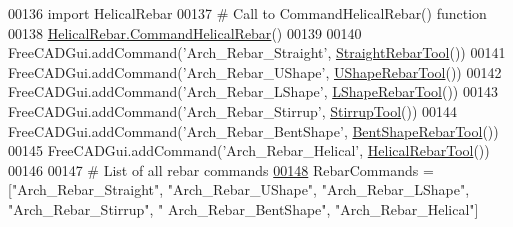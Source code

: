 \begin{DoxyCode}
00136         \textcolor{keyword}{import} HelicalRebar
00137         \textcolor{comment}{# Call to CommandHelicalRebar() function}
00138         \hyperlink{namespaceHelicalRebar_ad8ff0caf1e8a56ac47ce25062db8bc46}{HelicalRebar.CommandHelicalRebar}()
00139 
00140 FreeCADGui.addCommand(\textcolor{stringliteral}{'Arch\_Rebar\_Straight'}, \hyperlink{classRebarTools_1_1StraightRebarTool}{StraightRebarTool}())
00141 FreeCADGui.addCommand(\textcolor{stringliteral}{'Arch\_Rebar\_UShape'}, \hyperlink{classRebarTools_1_1UShapeRebarTool}{UShapeRebarTool}())
00142 FreeCADGui.addCommand(\textcolor{stringliteral}{'Arch\_Rebar\_LShape'}, \hyperlink{classRebarTools_1_1LShapeRebarTool}{LShapeRebarTool}())
00143 FreeCADGui.addCommand(\textcolor{stringliteral}{'Arch\_Rebar\_Stirrup'}, \hyperlink{classRebarTools_1_1StirrupTool}{StirrupTool}())
00144 FreeCADGui.addCommand(\textcolor{stringliteral}{'Arch\_Rebar\_BentShape'}, \hyperlink{classRebarTools_1_1BentShapeRebarTool}{BentShapeRebarTool}())
00145 FreeCADGui.addCommand(\textcolor{stringliteral}{'Arch\_Rebar\_Helical'}, \hyperlink{classRebarTools_1_1HelicalRebarTool}{HelicalRebarTool}())
00146 
00147 \textcolor{comment}{# List of all rebar commands}
\hypertarget{RebarTools_8py_source.tex_l00148}{}\hyperlink{namespaceRebarTools_ad80a0d98e5b180cb5f37b3d3702d4d4d}{00148} RebarCommands = [\textcolor{stringliteral}{"Arch\_Rebar\_Straight"}, \textcolor{stringliteral}{"Arch\_Rebar\_UShape"}, \textcolor{stringliteral}{"Arch\_Rebar\_LShape"}, \textcolor{stringliteral}{"Arch\_Rebar\_Stirrup"}, \textcolor{stringliteral}{"
      Arch\_Rebar\_BentShape"}, \textcolor{stringliteral}{"Arch\_Rebar\_Helical"}]
\end{DoxyCode}
